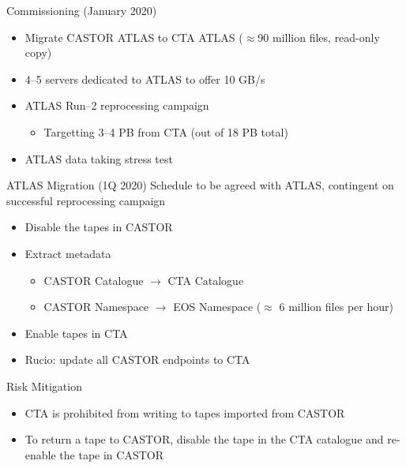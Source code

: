 \documentclass[aspectratio=1610]{beamer}
\begin{document}
\begin{frame}{Commissioning (January 2020)}
   \begin{itemize}
      \item Migrate CASTOR ATLAS to CTA ATLAS ($\approx$90 million files, read-only copy)
      \item 4--5 servers dedicated to ATLAS to offer 10 GB/s
      \item ATLAS Run--2 reprocessing campaign
   \begin{itemize}
      \item Targetting 3--4 PB from CTA (out of 18 PB total)
   \end{itemize}
      \item ATLAS data taking stress test
   \end{itemize}
\end{frame}

\begin{frame}{ATLAS Migration (1Q 2020)}
   Schedule to be agreed with ATLAS, contingent on successful reprocessing campaign

   \begin{itemize}
      \small
      \item Disable the tapes in CASTOR
      \item Extract metadata
      \begin{itemize}
         \item CASTOR Catalogue $\rightarrow$ CTA Catalogue
         \item CASTOR Namespace $\rightarrow$ EOS Namespace ($\approx$ 6 million files per hour)
      \end{itemize}
      \item Enable tapes in CTA
      \item Rucio: update all CASTOR endpoints to CTA
   \end{itemize}

   Risk Mitigation

   \begin{itemize}
      \small
         \item CTA is prohibited from writing to tapes imported from CASTOR
         \item To return a tape to CASTOR, disable the tape in the CTA catalogue and re-enable the tape in CASTOR
   \end{itemize}
\end{frame}
\end{document}
